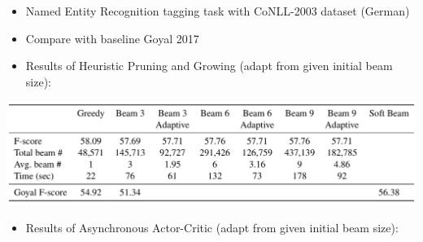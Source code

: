 \documentclass[a0paper,portrait]{baposter}
\begin{document}
\begin{poster}
{%


}



{
\begin{itemize}[leftmargin=*]
\item Named Entity Recognition tagging task with CoNLL-2003 dataset (German)
\vspace{-0.5mm}
\item Compare with baseline Goyal 2017 \cite{goyal2017continuous}
\vspace{-0.5mm}
\item Results of Heuristic Pruning and Growing (adapt from given initial beam size):
\end{itemize}

\begin{center}
    \includegraphics[width=0.9\linewidth]{det.png}
\end{center}

\begin{itemize}[leftmargin=*]
\item Results of Asynchronous Actor-Critic (adapt from given initial beam size):
\end{itemize}

}
\end{poster}
\end{document}
